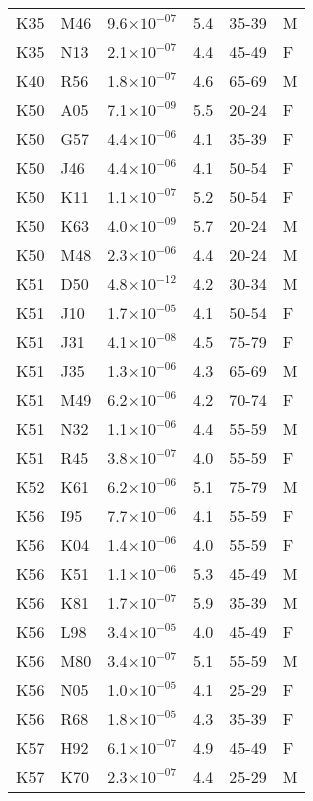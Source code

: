 \begin{longtable}{lllrll}
   K35 & M46 & 9.6$\times10^{-07}$ & 5.4 & 35-39 & M \\ 
   K35 & N13 & 2.1$\times10^{-07}$ & 4.4 & 45-49 & F \\ 
   K40 & R56 & 1.8$\times10^{-07}$ & 4.6 & 65-69 & M \\ 
   K50 & A05 & 7.1$\times10^{-09}$ & 5.5 & 20-24 & F \\ 
   K50 & G57 & 4.4$\times10^{-06}$ & 4.1 & 35-39 & F \\ 
   K50 & J46 & 4.4$\times10^{-06}$ & 4.1 & 50-54 & F \\ 
   K50 & K11 & 1.1$\times10^{-07}$ & 5.2 & 50-54 & F \\ 
   K50 & K63 & 4.0$\times10^{-09}$ & 5.7 & 20-24 & M \\ 
   K50 & M48 & 2.3$\times10^{-06}$ & 4.4 & 20-24 & M \\ 
   K51 & D50 & 4.8$\times10^{-12}$ & 4.2 & 30-34 & M \\ 
   K51 & J10 & 1.7$\times10^{-05}$ & 4.1 & 50-54 & F \\ 
   K51 & J31 & 4.1$\times10^{-08}$ & 4.5 & 75-79 & F \\ 
   K51 & J35 & 1.3$\times10^{-06}$ & 4.3 & 65-69 & M \\ 
   K51 & M49 & 6.2$\times10^{-06}$ & 4.2 & 70-74 & F \\ 
   K51 & N32 & 1.1$\times10^{-06}$ & 4.4 & 55-59 & M \\ 
   K51 & R45 & 3.8$\times10^{-07}$ & 4.0 & 55-59 & F \\ 
   K52 & K61 & 6.2$\times10^{-06}$ & 5.1 & 75-79 & M \\ 
   K56 & I95 & 7.7$\times10^{-06}$ & 4.1 & 55-59 & F \\ 
   K56 & K04 & 1.4$\times10^{-06}$ & 4.0 & 55-59 & F \\ 
   K56 & K51 & 1.1$\times10^{-06}$ & 5.3 & 45-49 & M \\ 
   K56 & K81 & 1.7$\times10^{-07}$ & 5.9 & 35-39 & M \\ 
   K56 & L98 & 3.4$\times10^{-05}$ & 4.0 & 45-49 & F \\ 
   K56 & M80 & 3.4$\times10^{-07}$ & 5.1 & 55-59 & M \\ 
   K56 & N05 & 1.0$\times10^{-05}$ & 4.1 & 25-29 & F \\ 
   K56 & R68 & 1.8$\times10^{-05}$ & 4.3 & 35-39 & F \\ 
   K57 & H92 & 6.1$\times10^{-07}$ & 4.9 & 45-49 & F \\ 
   K57 & K70 & 2.3$\times10^{-07}$ & 4.4 & 25-29 & M \\ 

\end{longtable}
